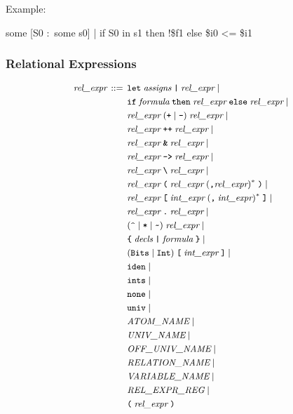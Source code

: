 \documentclass[a4paper,12pt]{article}
\begin{document}
    Example:

    \pre
    \ttfamily\small
    some [S0 :~some s0] | if S0 in s1 then !\$f1 else \$i0 <= \$i1
    \post

    \subsubsection{Relational Expressions}
    \label{relational-expressions}

    $$\small\begin{aligned}
                \textit{rel\_expr} \,::=\, {}
                & \verb|let|\; \textit{assigns}\; \verb!|!\; \textit{rel\_expr} \mid {} \\
                & \verb|if|\; \textit{formula}\; \verb|then|\; \textit{rel\_expr}\; \verb|else|\; \textit{rel\_expr} \mid {} \\
                & \textit{rel\_expr}\; (\verb|+| \mid \verb|-|)\; \textit{rel\_expr} \mid {} \\
                & \textit{rel\_expr}\; \verb|++|\; \textit{rel\_expr} \mid {} \\
                & \textit{rel\_expr}\; \verb|&|\; \textit{rel\_expr} \mid {} \\
                & \textit{rel\_expr}\; \verb|->|\; \textit{rel\_expr} \mid {} \\
                & \textit{rel\_expr}\; \verb|\|\; \textit{rel\_expr} \mid {} \\
                & \textit{rel\_expr}\; \verb|(|\; \textit{rel\_expr}\; (\verb|,| \textit{rel\_expr})^*\; \verb|)| \mid {} \\
                & \textit{rel\_expr}\; \verb|[|\; \textit{int\_expr}\; (\verb|,|\; \textit{int\_expr})^*\; \verb|]| \mid {} \\
                & \textit{rel\_expr}\; \verb|.|\; \textit{rel\_expr} \mid {} \\
                & (\verb|^| \mid \verb|*| \mid \verb|~|)\; \textit{rel\_expr} \mid {} \\
                & \verb|{|\; \textit{decls}\; \verb!|!\; \textit{formula}\; \verb|}| \mid {} \\
                & (\verb|Bits| \mid \verb|Int|)\; \verb|[|\; \textit{int\_expr} \;\verb|]| \mid {} \\
                & \verb|iden| \mid {} \\
                & \verb|ints| \mid {} \\
                & \verb|none| \mid {} \\
                & \verb|univ| \mid {} \\
                & \textit{ATOM\_NAME} \mid {} \\
                & \textit{UNIV\_NAME} \mid {} \\
                & \textit{OFF\_UNIV\_NAME} \mid {} \\
                & \textit{RELATION\_NAME} \mid {} \\
                & \textit{VARIABLE\_NAME} \mid {} \\
                & \textit{REL\_EXPR\_REG} \mid {} \\
                & \verb|(|\; \textit{rel\_expr}\; \verb|)|
    \end{aligned}$$
\end{document}
